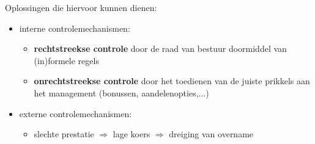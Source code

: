 Oplossingen die hiervoor kunnen dienen:
\begin{itemize}
	\item interne controlemechanismen:
	\begin{itemize}
		\item \textbf{rechtstreekse controle} door de raad van bestuur doormiddel van (in)formele regels
		\item \textbf{onrechtstreekse controle} door het toedienen van de juiste prikkels aan het management (bonussen, aandelenopties,...)
	\end{itemize}
	\item externe controlemechanismen: 
	\begin{itemize}
		\item slechte prestatie $\Rightarrow$ lage koers $\Rightarrow$ dreiging van overname
	\end{itemize}
\end{itemize}